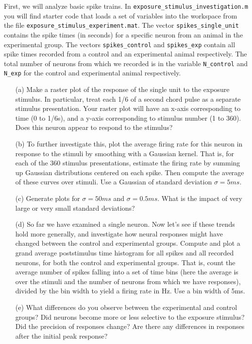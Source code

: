 \documentclass{article}
\begin{document}
\begin{itemize}
First, we will analyze basic spike trains. In \verb|exposure_stimulus_investigation.m| you will find starter code that loads a set of variables into the workspace from the file \verb|exposure_stimulus_experiment.mat|. The vector \verb|spikes_single_unit| contains the spike times (in seconds) for a specific neuron from an animal in the experimental group. The vectors \verb|spikes_control| and \verb|spikes_exp| contain all spike times recorded from a control and an experimental animal respectively. The total number of neurons from which we recorded is in the variable \verb|N_control| and \verb|N_exp| for the control and experimental animal respectively.

\begin{itemize}
\item[(a)] Make a raster plot of the response of the single unit to the exposure stimulus. In particular, treat each 1/6 of a second chord pulse as a separate stimulus presentation. Your raster plot will have an x-axis corresponding to time (0 to 1/6s), and a y-axis corresponding to stimulus number (1 to 360). Does this neuron appear to respond to the stimulus?
\item[(b)] To further investigate this, plot the average firing rate for this neuron in response to the stimuli by smoothing with a Gaussian kernel. That is, for each of the 360 stimulus presentations, estimate the firing rate by summing up Gaussian distributions centered on each spike. Then compute the average of these curves over stimuli. Use a Gaussian of standard deviation $\sigma = 5ms$. 
\item[(c)] Generate plots for $\sigma=50ms$ and $\sigma=0.5ms$. What is the impact of very large or very small standard deviations?
\item[(d)] So far we have examined a single neuron. Now let's see if these trends hold more generally, and investigate how neural responses might have changed between the control and experimental groups. Compute and plot a grand average poststimulus time histogram for all spikes and all recorded neurons, for both the control and experimental groups. That is, count the average number of spikes falling into a set of time bins (here the average is over the stimuli and the number of neurons from which we have responses), divided by the bin width to yield a firing rate in Hz. Use a bin width of 5ms. 
\item[(e)] What differences do you observe between the experimental and control groups? Did neurons become more or less selective to the exposure stimulus? Did the precision of responses change? Are there any differences in responses after the initial peak response?


\end{itemize}
\end{itemize}
\end{document}
